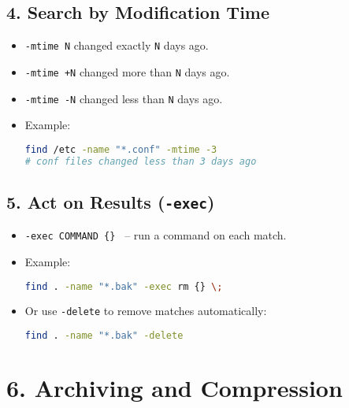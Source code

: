 \documentclass[a4paper]{report}
\begin{document}
\subsection*{4. Search by Modification Time}
\begin{itemize}
    \item \texttt{-mtime N} \textrightarrow changed exactly \texttt{N} days ago.
    \item \texttt{-mtime +N} \textrightarrow changed more than \texttt{N} days ago.
    \item \texttt{-mtime -N} \textrightarrow changed less than \texttt{N} days ago.
    \item Example:
        \begin{lstlisting}[language=bash]
find /etc -name "*.conf" -mtime -3
# conf files changed less than 3 days ago
        \end{lstlisting}
\end{itemize}


\subsection*{5. Act on Results (\texttt{-exec})}
\begin{itemize}
    \item \texttt{-exec COMMAND \{\} \;} -- run a command on each match.
    \item Example:
\begin{lstlisting}[language=bash]
find . -name "*.bak" -exec rm {} \;
\end{lstlisting}
    \item Or use \texttt{-delete} to remove matches automatically:
\begin{lstlisting}[language=bash]
find . -name "*.bak" -delete
\end{lstlisting}
\end{itemize}

\section*{6. Archiving and Compression}
\end{document}
